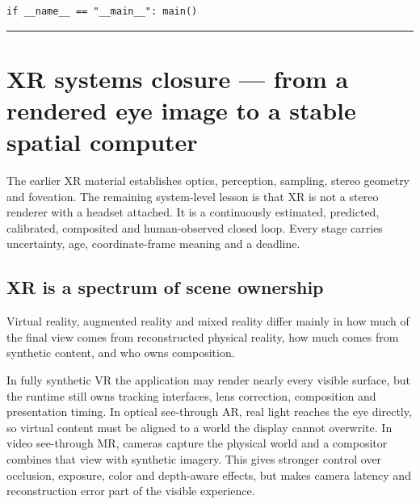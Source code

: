 \begin{verbatim}
if __name__ == "__main__": main()
\end{verbatim}

\begin{center}\rule{0.5\linewidth}{0.5pt}\end{center}

\section{XR systems closure --- from a rendered eye image to a stable spatial computer}\label{04-visual-computing-ii-ch035-xr-systems-closure-from-a-rendered-eye-image-to-a-stable-spatial-computer}

\hypertarget{04-visual-computing-ii-ch035-xr-systems-closure-from-a-rendered-eye-image-to-a-stable-spatial-computer}{}

The earlier XR material establishes optics, perception, sampling, stereo geometry and foveation. The remaining system-level lesson is that XR is not a stereo renderer with a headset attached. It is a continuously estimated, predicted, calibrated, composited and human-observed closed loop. Every stage carries uncertainty, age, coordinate-frame meaning and a deadline.

\subsection{XR is a spectrum of scene ownership}\label{04-visual-computing-ii-ch035-xr-is-a-spectrum-of-scene-ownership}

\hypertarget{04-visual-computing-ii-ch035-xr-is-a-spectrum-of-scene-ownership}{}

Virtual reality, augmented reality and mixed reality differ mainly in how much of the final view comes from reconstructed physical reality, how much comes from synthetic content, and who owns composition.

In fully synthetic VR the application may render nearly every visible surface, but the runtime still owns tracking interfaces, lens correction, composition and presentation timing. In optical see-through AR, real light reaches the eye directly, so virtual content must be aligned to a world the display cannot overwrite. In video see-through MR, cameras capture the physical world and a compositor combines that view with synthetic imagery. This gives stronger control over occlusion, exposure, color and depth-aware effects, but makes camera latency and reconstruction error part of the visible experience.

